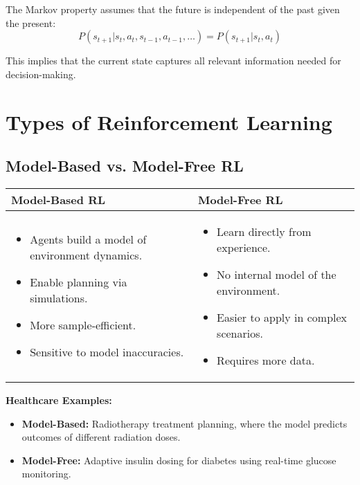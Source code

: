 \documentclass[12pt]{article}
\begin{document}
The Markov property assumes that the future is independent of the past given the present:
\[
P(s_{t+1} | s_t, a_t, s_{t-1}, a_{t-1}, \ldots) = P(s_{t+1} | s_t, a_t)
\]

This implies that the current state captures all relevant information needed for decision-making.

\section{Types of Reinforcement Learning}

\subsection{Model-Based vs. Model-Free RL}
\begin{table}[h]
    \centering
    \begin{tabular}{p{}p{}}
        \toprule
        \textbf{Model-Based RL} & \textbf{Model-Free RL} \\
        \midrule
        \begin{itemize}
            \item Agents build a model of environment dynamics.
            \item Enable planning via simulations.
            \item More sample-efficient.
            \item Sensitive to model inaccuracies.
        \end{itemize} &
        \begin{itemize}
            \item Learn directly from experience.
            \item No internal model of the environment.
            \item Easier to apply in complex scenarios.
            \item Requires more data.
        \end{itemize} \\
        \bottomrule
    \end{tabular}
\end{table}

\textbf{Healthcare Examples:}
\begin{itemize}
    \item \textbf{Model-Based:} Radiotherapy treatment planning, where the model predicts outcomes of different radiation doses.
    \item \textbf{Model-Free:} Adaptive insulin dosing for diabetes using real-time glucose monitoring.
\end{itemize}
\end{document}
